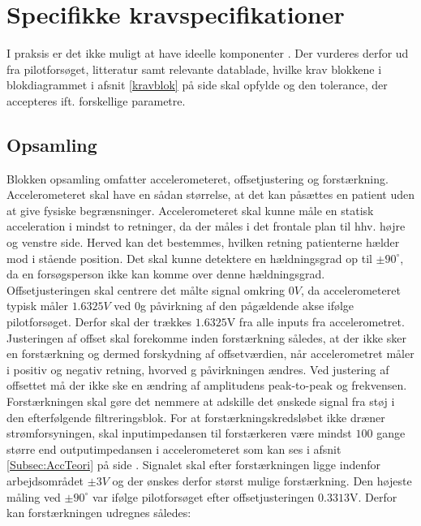 \section{Specifikke kravspecifikationer}
I praksis er det ikke muligt at have ideelle komponenter \cite{Nilsson2011}. Der vurderes derfor ud fra pilotforsøget, litteratur samt relevante datablade, hvilke krav blokkene i blokdiagrammet i afsnit \ref{kravblok} på side \pageref{kravblok} skal opfylde og den tolerance, der accepteres ift. forskellige parametre.

\subsection{Opsamling}\label{OpsamlingsAfs}
Blokken opsamling omfatter accelerometeret, offsetjustering og forstærkning. Accelerometeret skal have en sådan størrelse, at det kan påsættes en patient uden at give fysiske begrænsninger. Accelerometeret skal kunne måle en statisk acceleration i mindst to retninger, da der måles i det frontale plan til hhv. højre og venstre side. Herved kan det bestemmes, hvilken retning patienterne hælder mod i stående position. Det skal kunne detektere en hældningsgrad op til $\pm90^{\circ}$, da en forsøgsperson ikke kan komme over denne hældningsgrad. \\
Offsetjusteringen skal centrere det målte signal omkring $0V$, da accelerometeret typisk måler $1.6325V$ ved $0$g påvirkning af den pågældende akse ifølge pilotforsøget. Derfor skal der trækkes $1.6325$V fra alle inputs fra accelerometret. Justeringen af offset skal forekomme inden forstærkning således, at der ikke sker en forstærkning og dermed forskydning af offsetværdien, når accelerometret måler i positiv og negativ retning, hvorved g påvirkningen ændres. Ved justering af offsettet må der ikke ske en ændring af amplitudens peak-to-peak og frekvensen. \\
Forstærkningen skal gøre det nemmere at adskille det ønskede signal fra støj i den efterfølgende filtreringsblok. For at forstærkningskredsløbet ikke dræner strømforsyningen, skal inputimpedansen til forstærkeren være mindst $100$ gange større end outputimpedansen i accelerometeret som kan ses i afsnit \ref{Subsec:AccTeori} på side \pageref{Subsec:AccTeori}. Signalet skal efter forstærkningen ligge indenfor arbejdsområdet $\pm3V$ og der ønskes derfor størst mulige forstærkning. Den højeste måling ved $\pm90^{\circ}$ var ifølge pilotforsøget efter offsetjusteringen $0.3313$V. Derfor kan forstærkningen udregnes således:
